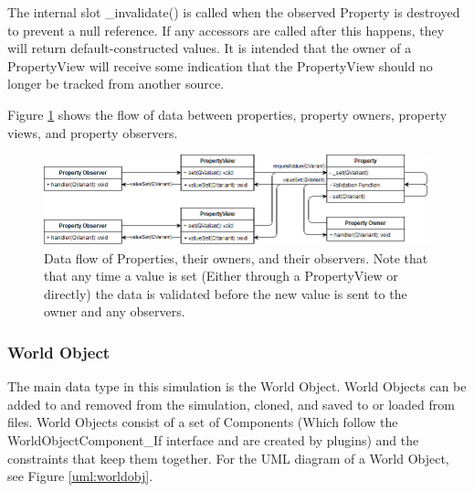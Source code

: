  	The internal slot \_invalidate() is called when the observed Property is destroyed to prevent a null reference. If any accessors are called after this happens, they will return default-constructed values. It is intended that the owner of a PropertyView will receive some indication that the PropertyView should no longer be tracked from another source.
 	
 	Figure \ref{uml:dataflow_property} shows the flow of data between properties, property owners, property views, and property observers.
 	
 \begin{figure}[h]
 	\begin{center}
 	\includegraphics[scale=0.5]{./images_design/uml/DataFlow_Property}
 	\caption{Data flow of Properties, their owners, and their observers. Note that that any time a value is set (Either through a PropertyView or directly) the data is validated before the new value is sent to the owner and any observers.\label{uml:dataflow_property}}
 	\end{center}
 \end{figure} 
 	
  \subsubsection*{World Object} \label{sec:worldobjclass}
	The main data type in this simulation is the World Object. World Objects can be added to and removed from the simulation, cloned, and saved to or loaded from files. World Objects consist of a set of Components (Which follow the WorldObjectComponent\_If interface and are created by plugins) and the constraints that keep them together. For the UML diagram of a World Object, see Figure \ref{uml:worldobj}.
	

